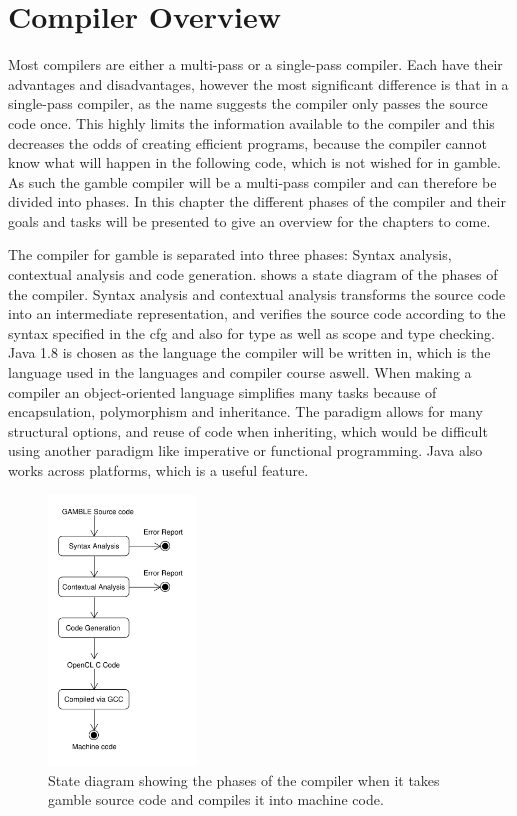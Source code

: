\chapter{Compiler Overview}\label{Chp:CompilerOverview}
Most compilers are either a multi-pass or a single-pass compiler. 
Each have their advantages and disadvantages, however the most significant difference is that in a single-pass compiler, as the name suggests the compiler only passes the source code once. 
This highly limits the information available to the compiler and this decreases the odds of creating efficient programs, because the compiler cannot know what will happen in the following code, which is not wished for in \gls{gamble}. 
As such the \gls{gamble} compiler will be a multi-pass compiler and can therefore be divided into phases.
In this chapter the different phases of the compiler and their goals and tasks will be presented to give an overview for the chapters to come.

The compiler for \gls{gamble} is separated into three phases: Syntax analysis, contextual analysis and code generation.
 shows a state diagram of the phases of the compiler.
Syntax analysis and contextual analysis transforms the source code into an intermediate representation, and verifies the source code according to the syntax specified in the \acrshort{cfg} and also for type as well as scope and type checking.
Java 1.8 is chosen as the language the compiler will be written in, which is the language used in the languages and compiler course aswell.
When making a compiler an object-oriented language simplifies many tasks because of encapsulation, polymorphism and inheritance. 
The paradigm allows for many structural options, and reuse of code when inheriting, which would be difficult using another paradigm like imperative or functional programming.
Java also works across platforms, which is a useful feature.

\begin{figure}[ht]
\centering
\includegraphics[width=0.35\textwidth]{figures/ClassDiagrams/CompilerDiagram.pdf}
\caption{State diagram showing the phases of the compiler when it takes \gls{gamble} source code and compiles it into machine code.}\label{fig:phases}
\end{figure}

